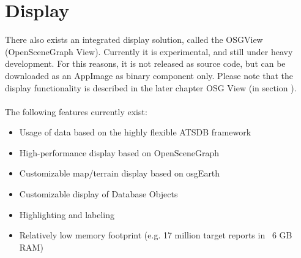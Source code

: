 \section{Display}
There also exists an integrated display solution, called the OSGView (OpenSceneGraph View). Currently it is experimental, and still under heavy development. For this reasons, it is not released as source code, but can be downloaded as an AppImage as binary component only. Please note that the display functionality is described in the later chapter OSG View (in section ).\\\\

The following features currently exist:

\begin{itemize}  
\item Usage of data based on the highly flexible ATSDB framework
\item High-performance display based on OpenSceneGraph
\item Customizable map/terrain display based on osgEarth
\item Customizable display of Database Objects
\item Highlighting and labeling
\item Relatively low memory footprint (e.g. 17 million target reports in ~6 GB RAM)
\end{itemize} 
